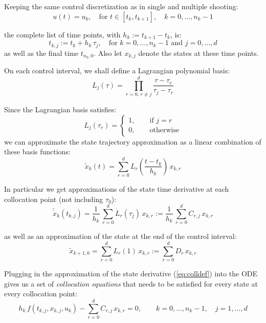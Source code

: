 \documentclass[a4paper,12pt]{book}
\begin{document}
{Keeping the same control discretization as in single and multiple shooting:
\begin{equation}
 u(t) = u_k, \quad \text{for $t \in [t_k, t_{k+1}], \quad k=0,\ldots,n_k-1$}
\end{equation}

the complete list of time points, with $h_k := t_{k+1}-t_k$, is:
\begin{equation}
 t_{k,j} := t_k + h_k \, \tau_j, \quad \text{for $k=0,\ldots,n_k-1$ and $j=0,\ldots,d$}
\end{equation}
as well as the final time $t_{n_k,0}$. Also let $x_{k,j}$ denote the states at these time points.

On each control interval, we shall define a Lagrangian polynomial basis:
\begin{equation}
 L_j(\tau) = \prod_{r=0, \, r \ne j}^{d} \frac{\tau - \tau_{r}}{\tau_j - \tau_r}
\end{equation}

Since the Lagrangian basis satisfies:
\begin{equation}
 L_j(\tau_r) = \left\{
 \begin{array}{l}
  1, \qquad \text{if $j=r$} \\
  0, \qquad \text{otherwise}
 \end{array}
  \right.
\end{equation}
we can approximate the state trajectory approximation as a linear combination of these basis functions:
\begin{equation}
\tilde{x}_k(t) = \sum_{r=0}^{d}{L_r\left(\frac{t-t_k}{h_k}\right) \, x_{k,r}}
\end{equation}

In particular we get approximations of the state time derivative at each collocation point (not including $\tau_0$):
\begin{equation}
\tilde{\dot{x}}_k(t_{k,j}) = \frac{1}{h_k} \, \sum_{r=0}^{d}{\dot{L}_r(\tau_j) \, x_{k,r}} := \frac{1}{h_k} \, \sum_{r=0}^{d}{C_{r,j} \, x_{k,r}}
\label{eq:colldef}
\end{equation}

as well as an approximation of the state at the end of the control interval:
\begin{equation}
\tilde{x}_{k+1,0} = \sum_{r=0}^{d}{L_r(1) \, x_{k,r}} := \sum_{r=0}^{d}{D_r \, x_{k,r}}
\label{eq:contdef}
\end{equation}

Plugging in the approximation of the state derivative (\ref{eq:colldef}) into the ODE gives us a set of \emph{collocation equations} that needs to be satisfied for every state at every collocation point:
\begin{equation}
h_k \, f(t_{k,j},x_{k,j},u_k) - \sum_{r=0}^{d}{C_{r,j} \, x_{k,r}} = 0, \qquad k=0,\ldots,n_k-1, \quad j=1,\ldots,d
\end{equation}

}
\end{document}
